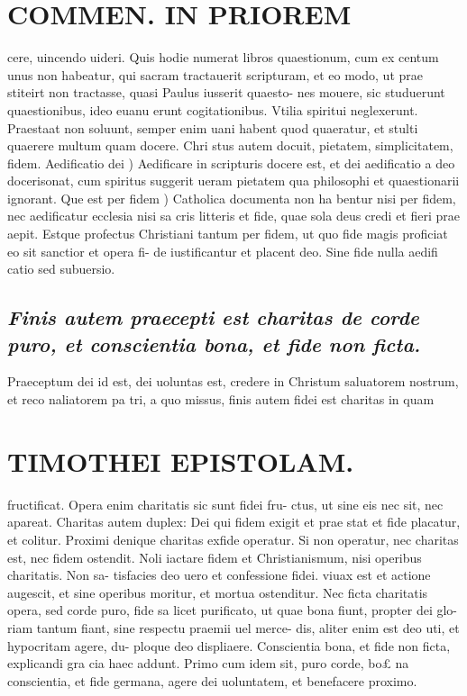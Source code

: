 \documentclass{article}
\begin{document}
\begin{pages}
\section*{COMMEN. IN PRIOREM }
\marginpar{[ p.14 ]}\pstart cere, uincendo uideri. Quis hodie numerat libros quaestionum, cum ex centum unus non habeatur, qui sacram tractauerit scripturam, et eo modo, ut prae stiteirt non tractasse, quasi Paulus iusserit quaesto- nes mouere, sic studuerunt quaestionibus, ideo euanu erunt cogitationibus. Vtilia spiritui neglexerunt. Praestaat non soluunt, semper enim uani habent quod quaeratur, et stulti quaerere multum quam docere. Chri stus autem docuit, pietatem, simplicitatem, fidem. Aedificatio dei ) Aedificare in scripturis docere est, et dei aedificatio a deo docerisonat, cum spiritus suggerit ueram pietatem qua philosophi et quaestionarii ignorant.  \pend\pstart Que est per fidem ) Catholica documenta non ha bentur nisi per fidem, nec aedificatur ecclesia nisi sa cris litteris et fide, quae sola deus credi et fieri prae aepit. Estque profectus Christiani tantum per fidem, ut quo fide magis proficiat eo sit sanctior et opera fi- de iustificantur et placent deo. Sine fide nulla aedifi catio sed subuersio.  \pend
{}
{}
\subsection*{\textit{Finis autem praecepti est charitas de corde puro, et conscientia bona, et fide non ficta. }}\pstart Praeceptum dei id est, dei uoluntas est, credere in Christum saluatorem nostrum, et reco naliatorem pa tri, a quo missus, finis autem fidei est charitas in quam  \pend
\section*{TIMOTHEI EPISTOLAM. }
\marginpar{[ p.15 ]}\pstart fructificat. Opera enim charitatis sic sunt fidei fru- ctus, ut sine eis nec sit, nec apareat. Charitas autem duplex: Dei qui fidem exigit et prae stat et fide placatur, et colitur. Proximi denique charitas exfide operatur. Si non operatur, nec charitas est, nec fidem ostendit. Noli iactare fidem et Christianismum, nisi operibus charitatis. Non sa- tisfacies deo uero et confessione fidei. viuax est et actione augescit, et sine operibus moritur, et mortua ostenditur.  \pend\pstart Nec ficta charitatis opera, sed corde puro, fide sa licet purificato, ut quae bona fiunt, propter dei glo- riam tantum fiant, sine respectu praemii uel merce- dis, aliter enim est deo uti, et hypocritam agere, du- ploque deo displiaere.  \pend\pstart Conscientia bona, et fide non ficta, explicandi gra cia haec addunt. Primo cum idem sit, puro corde, bo£ na conscientia, et fide germana, agere dei uoluntatem, et benefacere proximo.  \pend
{}
{}

\end{pages}
\end{document}
